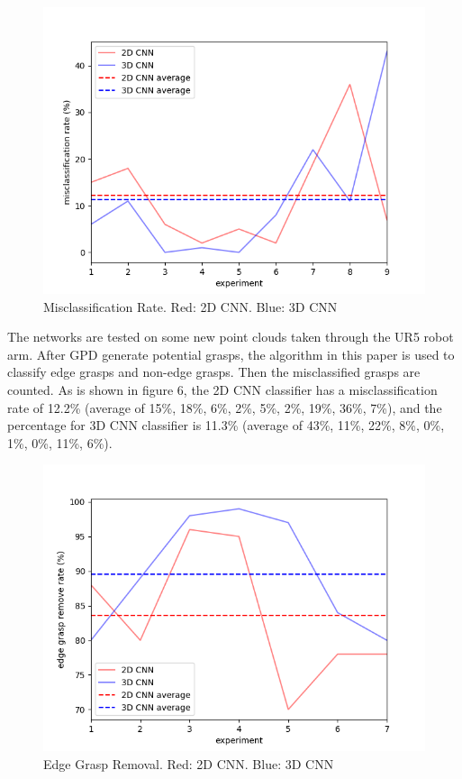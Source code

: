 \documentclass[letterpaper]{article} %
\begin{document}
\begin{figure}[H]
    \centering
    \includegraphics[width=\columnwidth]{images/exp1.png}
    \caption{Misclassification Rate. Red: 2D CNN. Blue: 3D CNN}
    \label{fig:my_label}
\end{figure}
The networks are tested on some new point clouds taken through the UR5 robot arm. After GPD generate potential grasps, the algorithm in this paper is used to classify edge grasps and non-edge grasps. Then the misclassified grasps are counted. As is shown in figure 6, the 2D CNN classifier has a misclassification rate of 12.2\% (average of 15\%, 18\%, 6\%, 2\%, 5\%, 2\%, 19\%, 36\%, 7\%), and the percentage for 3D CNN classifier is 11.3\% (average of 43\%, 11\%, 22\%, 8\%, 0\%, 1\%, 0\%, 11\%, 6\%).

\begin{figure}[H]
    \centering
    \includegraphics[width=\columnwidth]{images/exp2.png}
    \caption{Edge Grasp Removal. Red: 2D CNN. Blue: 3D CNN}
    \label{fig:my_label}
\end{figure}
\end{document}
